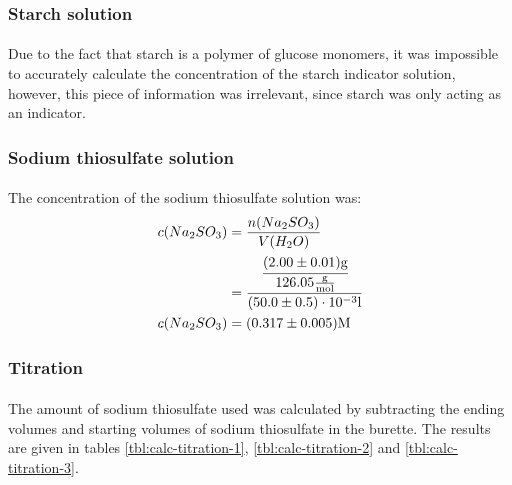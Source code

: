 \documentclass[a4paper]{article}
\begin{document}
\subsubsection{Starch solution}

\paragraph*{}
Due to the fact that starch is a polymer of glucose monomers, it was impossible
to accurately calculate the concentration of the starch indicator solution,
however, this piece of information was irrelevant, since starch was only acting
as an indicator.

\subsubsection{Sodium thiosulfate solution}

\paragraph*{}
The concentration of the sodium thiosulfate solution was:
\begin{align*}
  c(Na_2SO_3) 
  &= \frac{n(Na_2SO_3)}{V(H_2O)} \\
  &= \cfrac{\cfrac{(2.00 \pm 0.01)\si{g}}{126.05\si{\frac{g}{mol}}}}{(50.0 \pm
    0.5) \cdot 10^{-3} \si{l}} \\
  c(Na_2SO_3) &= (0.317 \pm 0.005) \si{M}
\end{align*}

\subsubsection{Titration}

\paragraph*{}
The amount of sodium thiosulfate used was calculated by subtracting the ending
volumes and starting volumes of sodium thiosulfate in the burette. The results
are given in tables \ref{tbl:calc-titration-1}, \ref{tbl:calc-titration-2} and
\ref{tbl:calc-titration-3}.
\end{document}
